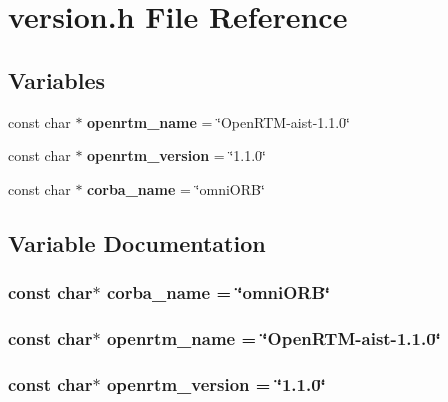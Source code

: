 \section{version.h File Reference}
\label{version_8h}
\subsection*{Variables}
\begin{DoxyCompactItemize}
\item 
const char $\ast$ {\bf openrtm\_\-name} = \char`\"{}OpenRTM-\/aist-\/1.1.0\char`\"{}
\item 
const char $\ast$ {\bf openrtm\_\-version} = \char`\"{}1.1.0\char`\"{}
\item 
const char $\ast$ {\bf corba\_\-name} = \char`\"{}omniORB\char`\"{}
\end{DoxyCompactItemize}


\subsection{Variable Documentation}
\subsubsection[{corba\_\-name}]{\setlength{\rightskip}{0pt plus 5cm}const char$\ast$ {\bf corba\_\-name} = \char`\"{}omniORB\char`\"{}}\label{version_8h_ad27a64b894af70258b4d529f27be0bce}
\subsubsection[{openrtm\_\-name}]{\setlength{\rightskip}{0pt plus 5cm}const char$\ast$ {\bf openrtm\_\-name} = \char`\"{}OpenRTM-\/aist-\/1.1.0\char`\"{}}\label{version_8h_a058007c718cf04f129211045c4593f8c}
\subsubsection[{openrtm\_\-version}]{\setlength{\rightskip}{0pt plus 5cm}const char$\ast$ {\bf openrtm\_\-version} = \char`\"{}1.1.0\char`\"{}}\label{version_8h_ab0567f69d63c309cf37d268117eda67d}
